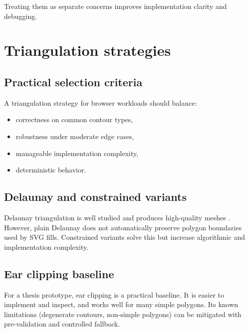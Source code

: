 Treating them as separate concerns improves implementation clarity and debugging.

\section{Triangulation strategies}

\subsection{Practical selection criteria}

A triangulation strategy for browser workloads should balance:

\begin{itemize}
\item correctness on common contour types,
\item robustness under moderate edge cases,
\item manageable implementation complexity,
\item deterministic behavior.
\end{itemize}

\subsection{Delaunay and constrained variants}

Delaunay triangulation is well studied and produces high-quality meshes \cite{shewchuk_triangle}.
However, plain Delaunay does not automatically preserve polygon boundaries used by SVG fills.
Constrained variants solve this but increase algorithmic and implementation complexity.

\subsection{Ear clipping baseline}

For a thesis prototype, ear clipping is a practical baseline.
It is easier to implement and inspect, and works well for many simple polygons.
Its known limitations (degenerate contours, non-simple polygons) can be mitigated with pre-validation and controlled fallback.

